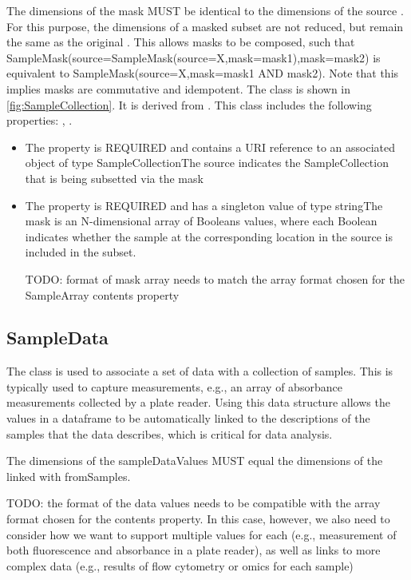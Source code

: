         The dimensions of the mask MUST be identical to the dimensions of the source . For this purpose,
        the dimensions of a masked subset are not reduced, but remain the same as the original . This allows
        masks to be composed, such that SampleMask(source=SampleMask(source=X,mask=mask1),mask=mask2) is equivalent to
        SampleMask(source=X,mask=mask1 AND mask2). Note that this implies masks are commutative and idempotent.%
\newline%
\linebreak%
The  class is shown in \ref{fig:SampleCollection}. It is derived from .%
This class includes the following properties: , . %
\begin{itemize}%
\item%
The  property is REQUIRED and contains a URI reference to an associated object of type SampleCollectionThe source indicates the SampleCollection that is being subsetted via the mask%
\item%
The  property is REQUIRED and has a singleton value of type stringThe mask is an N-dimensional array of Booleans values, where each Boolean indicates whether the
        sample at the corresponding location in the source is included in the subset.

        TODO: format of mask array needs to match the array format chosen for the SampleArray contents property%
\end{itemize}%
\subsection{SampleData}%
\label{sec:labop:SampleData}%
The  class is used to associate a set of data with a collection of samples.
        This is typically used to capture measurements, e.g., an array of absorbance measurements collected by
        a plate reader. Using this data structure allows the values in a dataframe to be automatically linked to
        the descriptions of the samples that the data describes, which is critical for data analysis.

        The dimensions of the sampleDataValues MUST equal the dimensions of the  linked with fromSamples.

        TODO: the format of the data values needs to be compatible with the array format chosen for the
         contents property. In this case, however, we also need to consider how we want to support
        multiple values for each  (e.g., measurement of both fluorescence and absorbance in a plate reader),
        as well as links to more complex data (e.g., results of flow cytometry or omics for each sample)%
\newline%
\linebreak%


